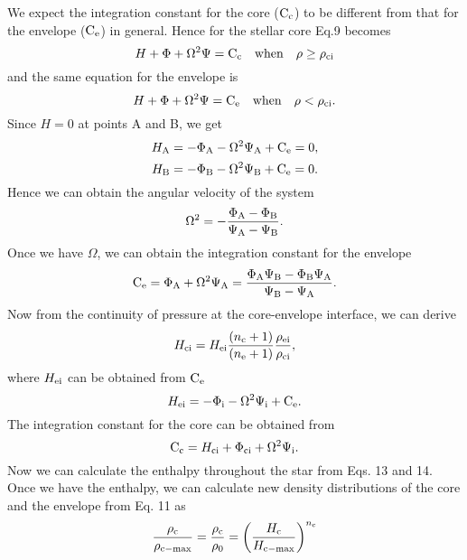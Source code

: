 \documentclass[a4paper,fleqn,usenatbib]{mnras}
\begin{document}
We expect the integration constant for the core (${\rm C_{c}}$) to be different from that for the envelope (${\rm C_{e}}$) in general. Hence for the stellar core Eq.9 becomes
\begin{equation}
H+\Phi+\Omega^2 \Psi= {\rm C_{c}}   \quad {\rm when}  \quad \rho \geq \rho_{\rm ci}
\end{equation}
and the same equation for the envelope is
\begin{equation}
H+\Phi+\Omega^2 \Psi= {\rm C_{e}}    \quad {\rm when}  \quad \rho < \rho_{\rm ci}.
\end{equation}
Since $H=0$ at points A and B, we get
\begin{equation}
H_{\rm A}=-\Phi_{\rm A}-\Omega^2 \Psi_{\rm A}+ {\rm C_{e}} = 0,
\end{equation}
\begin{equation}
H_{\rm B}=-\Phi_{\rm B}-\Omega^2 \Psi_{\rm B}+ {\rm C_{e}} = 0.
\end{equation}
Hence we can obtain the angular velocity of the system
\begin{equation}
\Omega^2= -\frac{\Phi_{\rm A}-\Phi_{\rm B}}{\Psi_{\rm A}-\Psi_{\rm B}}.
\end{equation}
Once we have $\Omega$, we can obtain the integration constant for the envelope 
\begin{equation}
{\rm C_{e}}=\Phi_{\rm A}+\Omega^2\Psi_{\rm A}=\frac{\Phi_{\rm A} \Psi_{\rm B}-\Phi_{\rm B} \Psi_{\rm A}}{\Psi_{\rm B} - \Psi_{\rm A}}.
\end{equation}
Now from the continuity of pressure at the core-envelope interface, we can derive
\begin{equation}
H_{\rm ci}=H_{\rm ei} \frac{(n_{\rm c}+1)}{(n_{\rm e}+1)} \frac{\rho_{\rm ei}}{\rho_{\rm ci}},
\end{equation}
where $H_{\rm ei}$ can be obtained from ${\rm C_{e}}$
\begin{equation}
H_{\rm ei}=-\Phi_{\rm i}-\Omega^2 \Psi_{\rm i} + {\rm C_{e}}.
\end{equation}
The integration constant for the core can be obtained from
\begin{equation}
{\rm C_{c}}=H_{\rm ci}+\Phi_{\rm ci}+\Omega^2\Psi_{\rm i} .
\end{equation}
Now we can calculate the enthalpy throughout the star from Eqs. 13 and 14.
Once we have the enthalpy, we can calculate new density distributions of the core and the envelope from Eq. 11 as 
\begin{equation}
\frac{\rho_{\rm c}}{\rho_{\rm c-max}}= \frac{\rho_{\rm c}}{\rho_{\rm 0}}=\left( \frac{H_{\rm c}}{H_{\rm c-max}} \right)^{n_{\rm c}}
\end{equation}
\end{document}
